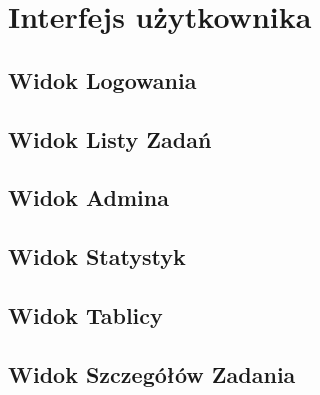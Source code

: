 \chapter{Interfejs użytkownika}

\section{Widok Logowania}
\section{Widok Listy Zadań}
\section{Widok Admina}
\section{Widok Statystyk}
\section{Widok Tablicy}
\section{Widok Szczegółów Zadania}